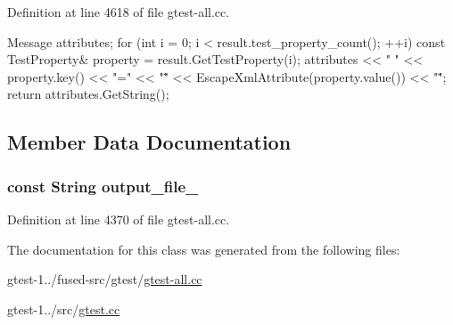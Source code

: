 \-Definition at line 4618 of file gtest-\/all.\-cc.


\begin{DoxyCode}
                              {
  Message attributes;
  for (int i = 0; i < result.test_property_count(); ++i) {
    const TestProperty& property = result.GetTestProperty(i);
    attributes << " " << property.key() << "="
        << "\"" << EscapeXmlAttribute(property.value()) << "\"";
  }
  return attributes.GetString();
}
\end{DoxyCode}


\subsection{\-Member \-Data \-Documentation}
\hypertarget{classtesting_1_1internal_1_1XmlUnitTestResultPrinter_a20d1d061771050add045d968a88ab3ff}{
\subsubsection[{output\-\_\-file\-\_\-}]{\setlength{\rightskip}{0pt plus 5cm}const {\bf \-String} {\bf output\-\_\-file\-\_\-}}}\label{d6/de5/classtesting_1_1internal_1_1XmlUnitTestResultPrinter_a20d1d061771050add045d968a88ab3ff}


\-Definition at line 4370 of file gtest-\/all.\-cc.



\-The documentation for this class was generated from the following files\-:\begin{DoxyCompactItemize}
\item 
gtest-\/1../fused-\/src/gtest/\hyperlink{fused-src_2gtest_2gtest-all_8cc}{gtest-\/all.\-cc}\item 
gtest-\/1../src/\hyperlink{gtest_8cc}{gtest.\-cc}\end{DoxyCompactItemize}
